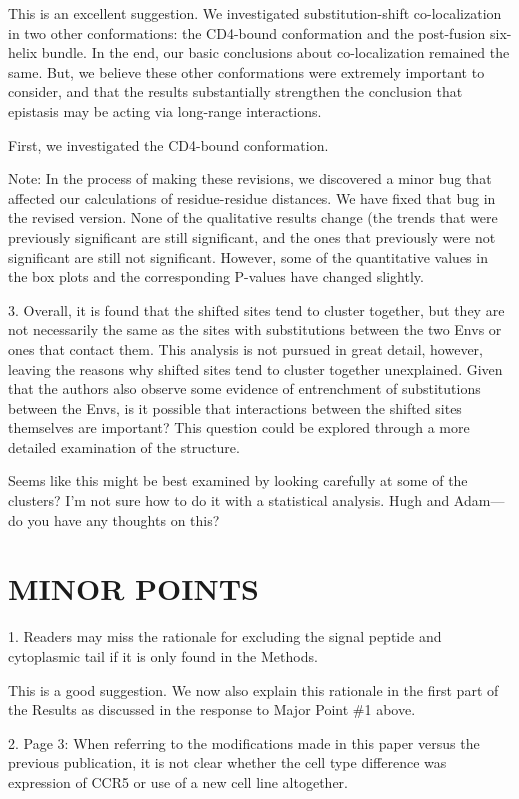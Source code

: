 \documentclass[11pt, oneside]{article}   	%
\begin{document}
{\color{red}
This is an excellent suggestion. We investigated substitution-shift co-localization in two other conformations: the CD4-bound conformation and the post-fusion six-helix bundle. In the end, our basic conclusions about co-localization remained the same. But, we believe these other conformations were extremely important to consider, and that the results substantially strengthen the conclusion that epistasis may be acting via long-range interactions.

First, we investigated the CD4-bound conformation.

Note: In the process of making these revisions, we discovered a minor bug that affected our calculations of residue-residue distances. We have fixed that bug in the revised version. None of the qualitative results change (the trends that were previously significant are still significant, and the ones that previously were not significant are still not significant. However, some of the quantitative values in the box plots and the corresponding P-values have changed slightly.
}

3. Overall, it is found that the shifted sites tend to cluster together, but they are not necessarily the same as the sites with substitutions between the two Envs or ones that contact them. This analysis is not pursued in great detail, however, leaving the reasons why shifted sites tend to cluster together unexplained. Given that the authors also observe some evidence of entrenchment of substitutions between the Envs, is it possible that interactions between the shifted sites themselves are important? This question could be explored through a more detailed examination of the structure. 

{\color{red}
Seems like this might be best examined by looking carefully at some of the clusters?
I'm not sure how to do it with a statistical analysis.
Hugh and Adam---do you have any thoughts on this?
}

\section*{MINOR POINTS}

1. Readers may miss the rationale for excluding the signal peptide and cytoplasmic tail if it is only found in the Methods. 

{\color{black}
This is a good suggestion.
We now also explain this rationale in the first part of the Results as discussed in the response to Major Point \#1 above.}

2. Page 3: When referring to the modifications made in this paper versus the previous publication, it is not clear whether the cell type difference was expression of CCR5 or use of a new cell line altogether. 
\end{document}
